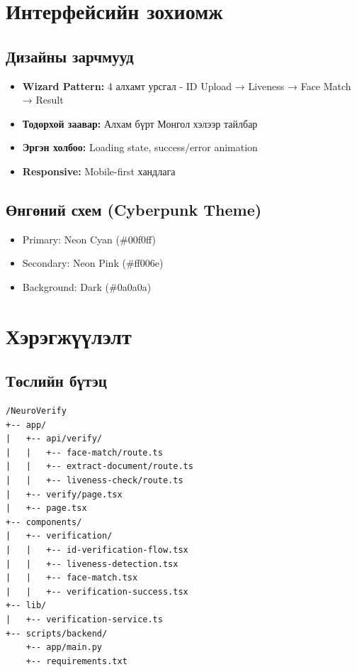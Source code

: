 \documentclass[12pt,a4paper]{article}
\begin{document}
\section{Интерфейсийн зохиомж}

\subsection{Дизайны зарчмууд}
\begin{itemize}[leftmargin=1cm]
  \item \textbf{Wizard Pattern:} 4 алхамт урсгал - ID Upload → Liveness → Face Match → Result
  \item \textbf{Тодорхой заавар:} Алхам бүрт Монгол хэлээр тайлбар
  \item \textbf{Эргэн холбоо:} Loading state, success/error animation
  \item \textbf{Responsive:} Mobile-first хандлага
\end{itemize}

\subsection{Өнгөний схем (Cyberpunk Theme)}
\begin{itemize}[leftmargin=1cm]
  \item Primary: Neon Cyan (\#00f0ff)
  \item Secondary: Neon Pink (\#ff006e)
  \item Background: Dark (\#0a0a0a)
\end{itemize}

\section{Хэрэгжүүлэлт}

\subsection{Төслийн бүтэц}

\begin{lstlisting}[caption={Project Directory Structure}]
/NeuroVerify
+-- app/
|   +-- api/verify/
|   |   +-- face-match/route.ts
|   |   +-- extract-document/route.ts
|   |   +-- liveness-check/route.ts
|   +-- verify/page.tsx
|   +-- page.tsx
+-- components/
|   +-- verification/
|   |   +-- id-verification-flow.tsx
|   |   +-- liveness-detection.tsx
|   |   +-- face-match.tsx
|   |   +-- verification-success.tsx
+-- lib/
|   +-- verification-service.ts
+-- scripts/backend/
    +-- app/main.py
    +-- requirements.txt
\end{lstlisting}
\end{document}
